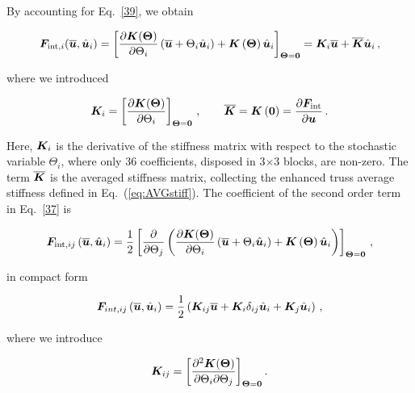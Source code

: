 \documentclass[preprint,12pt]{elsarticle}
\newcommand{\mbs}[1]{\boldsymbol{#1}}
\def \Tet {\mbs{\Theta}}
\def    \obu {{\overline{\bu}}}
\def    \obK {{\overline{\bK}}}
\def    \hbu {{\hat{\bu}_i}}
\begin{document}
By accounting for Eq.~\eqref{39}, we obtain
\begin{linenomath}
\begin{equation}\label{42}
    \bF_{{\rm int},i} (\obu, \hbu) =
    \left[ \frac{\partial \bK (\Tet)}{\partial \Theta_i} \left(\obu +\Theta_i \hbu\right) 
    +
    \bK \left( \Tet \right) \hbu 
    \right]_{\Tet=\b0} = 
    \bK_i \obu + \obK \hbu \, ,
\end{equation}
\end{linenomath}
where we introduced
\begin{linenomath}
\begin{equation}\label{43}
    \bK_i 
    = 
   \left[ \frac{\partial \bK (\Tet)}{\partial \Theta_i} \right]_{\Tet=\b0}\, , \qquad
    \obK = \bK \left( \b0 \right)
    =
    \frac{\partial \bF_{\rm int}}{\partial \bu} \, .
\end{equation}
\end{linenomath}
Here, $\bK_i$ is the derivative of the stiffness matrix with respect to the stochastic variable $\Theta_i$, where only 36 coefficients, disposed in 3$\times$3 blocks, are non-zero. The term $\obK$ is the averaged stiffness matrix, collecting the enhanced truss average stiffness defined in Eq.~(\ref{eq:AVGstiff}). The coefficient of the second order term in Eq.~\eqref{37} is
\begin{linenomath}
\begin{equation}\label{44}
    \bF_{{\rm int},ij} \left( \obu, \hbu\right) =
    \frac{1}{2} 
    \left[
    \frac{\partial}{\partial \Theta_j}
    \left( \frac{\partial \bK (\Tet)}{\partial \Theta_i} \left(\obu +\Theta_i \hbu\right) +
    \bK \left( \Tet \right) \hbu \right) \right]_{\Tet=\b0} \, ,
\end{equation}
\end{linenomath}
in compact form
\begin{linenomath}
\begin{equation}\label{47}
    \bF_{int,ij} \left( \obu, \hbu\right) =
    \frac{1}{2} 
  \left(  \bK_{ij} \obu + \bK_i \delta_{ij}\hbu+ \bK_j \hbu \right)\, ,
\end{equation}
\end{linenomath}
where  we introduce
\begin{linenomath}
\begin{equation}\label{46}
    \bK_{ij} 
    = 
    \left[\frac{\partial^2 \bK (\Tet)}{\partial \Theta_i \partial\Theta_j} \right]_{\Tet=\b0}.
\end{equation}
\end{linenomath}
\end{document}
